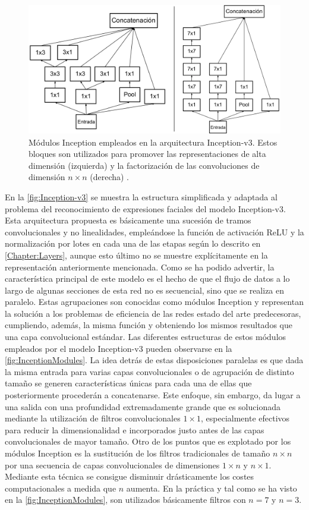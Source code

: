 \begin{figure}
    \centering
    \includegraphics[width=\textwidth]{Images/InceptionModules.png}
    \caption{Módulos Inception empleados en la arquitectura Inception-v3. Estos bloques son utilizados para promover las representaciones de alta dimensión (izquierda) y la factorización de las convoluciones de dimensión $n\times n$ (derecha) \cite{Inception-v3}.}
    \label{fig:InceptionModules}
\end{figure}

En la \autoref{fig:Inception-v3} se muestra la estructura simplificada y adaptada al problema del reconocimiento de expresiones faciales del modelo Inception-v3. Esta arquitectura propuesta es básicamente una sucesión de tramos convolucionales y no linealidades, empleándose la función de activación ReLU y la normalización por lotes en cada una de las etapas según lo descrito en \autoref{Chapter:Layers}, aunque esto último no se muestre explícitamente en la representación anteriormente mencionada. Como se ha podido advertir, la característica principal de este modelo es el hecho de que el flujo de datos a lo largo de algunas secciones de esta red no es secuencial, sino que se realiza en paralelo. Estas agrupaciones son conocidas como módulos Inception y representan la solución a los problemas de eficiencia de las redes estado del arte predecesoras, cumpliendo, además, la misma función y obteniendo los mismos resultados que una capa convolucional estándar. Las diferentes estructuras de estos módulos empleados por el modelo Inception-v3 pueden observarse en la \autoref{fig:InceptionModules}. La idea detrás de estas disposiciones paralelas es que dada la misma entrada para varias capas convolucionales o de agrupación de distinto tamaño se generen características únicas para cada una de ellas que posteriormente procederán a concatenarse. Este enfoque, sin embargo, da lugar a una salida con una profundidad extremadamente grande que es solucionada mediante la utilización de filtros convolucionales $1\times 1$, especialmente efectivos para reducir la dimensionalidad \cite{NetworkInNetwork} e incorporados justo antes de las capas convolucionales de mayor tamaño. Otro de los puntos que es explotado por los módulos Inception es la sustitución de los filtros tradicionales de tamaño $n\times n$ por una secuencia de capas convolucionales de dimensiones $1\times n$ y $n \times 1$. Mediante esta técnica se consigue disminuir drásticamente los costes computacionales a medida que $n$ aumenta. En la práctica y tal como se ha visto en la \autoref{fig:InceptionModules}, son utilizados básicamente filtros con $n = 7$ y $n = 3$.


